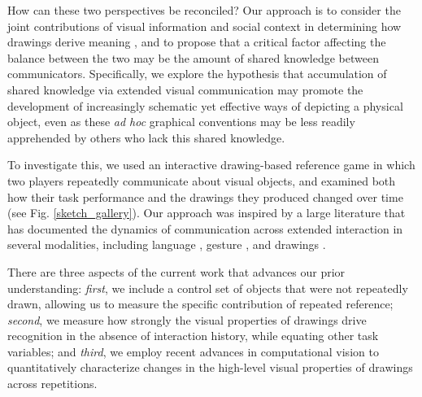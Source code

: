 \documentclass[10pt,letterpaper]{article}
\begin{document}
How can these two perspectives be reconciled?
Our approach is to consider the joint contributions of visual information and social context in determining how drawings derive meaning \cite{fan2018modeling,abell2009canny}, and to propose that a critical factor affecting the balance between the two may be the amount of shared knowledge between communicators.
Specifically, we explore the hypothesis that accumulation of shared knowledge via extended visual communication may promote the development of increasingly schematic yet effective ways of depicting a physical object, even as these \textit{ad hoc} graphical conventions may be less readily apprehended by others who lack this shared knowledge.

To investigate this, we used an interactive drawing-based reference game in which two players repeatedly communicate about visual objects, and examined both how their task performance and the drawings they produced changed over time (see Fig. \ref{sketch_gallery}).
Our approach was inspired by a large literature that has documented the dynamics of communication across extended interaction in several modalities, including language \cite{ClarkWilkesGibbs86_ReferringCollaborative,HawkinsFrankGoodman17_ConventionFormation}, gesture \cite{goldin1996silence,fay2014creating}, and drawings \cite{garrod_foundations_2007,fay2010interactive}.



There are three aspects of the current work that advances our prior understanding: \emph{first}, we include a control set of objects that were not repeatedly drawn, allowing us to measure the specific contribution of repeated reference; \emph{second}, we measure how strongly the visual properties of drawings drive recognition in the absence of interaction history, while equating other task variables; and \emph{third}, we employ recent advances in computational vision to quantitatively characterize changes in the high-level visual properties of drawings across repetitions.
\end{document}
